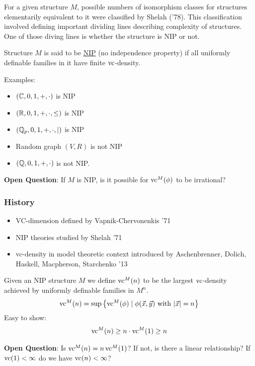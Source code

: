 \documentclass{beamer}
\newcommand{\curly}[1]{\left\{ #1 \right\}}
\newcommand{\defn}{\underline}
\begin{document}
\begin{frame}
  For a given structure $M$, possible numbers of isomorphism classes for structures elementarily equivalent to it were classified by Shelah ('78).
  This classification involved defining important dividing lines describing complexity of structures.
  One of those diving lines is whether the structure is NIP or not.
  \begin{Definition}
    Structure $M$ is said to be \defn{NIP} (no independence property) if all uniformly definable families in it have finite $\operatorname{vc}$-density.
  \end{Definition}
  Examples:
  \begin{itemize}
  \item $(\mathbb{C}, 0, 1, +, \cdot)$ is NIP
  \item $(\mathbb{R}, 0, 1, +, \cdot, \leq)$ is NIP
  \item $(\mathbb{Q}_p, 0, 1, +, \cdot, \mid)$ is NIP
  \item Random graph $(V, R)$ is not NIP
  \item $(\mathbb{Q}, 0, 1, +, \cdot)$ is not NIP.
  \end{itemize}

  \textbf{Open Question}: If $M$ is NIP, is it possible for $\operatorname{vc}^M(\phi)$ to be irrational? \\
\end{frame}

\begin{frame}
  \frametitle{History}
  \begin{itemize}
  \item VC-dimension defined by Vapnik-Chervonenkis '71
  \item NIP theories studied by Shelah '71
  \item vc-density in model theoretic context introduced by Aschenbrenner, Dolich, Haskell, Macpherson, Starchenko '13
  \end{itemize}
\end{frame}

\begin{frame}
  Given an NIP structure $M$ we define $\operatorname{vc}^M(n)$ to be the largest $\operatorname{vc}$-density achieved by uniformly definable families in $M^n$.
  \begin{align*}
    \vc^M(n) = \sup \curly{ \vc^M(\phi) \mid \phi(\vec x, \vec y) \text{ with } |\vec x| = n}
  \end{align*}
  Easy to show:
  \begin{align*}
    \operatorname{vc}^M(n) \geq n \cdot \operatorname{vc}^M(1) \geq n
  \end{align*}

  \textbf{Open Question}: Is $\operatorname{vc}^M(n) = n \operatorname{vc}^M(1)$? If not, is there a linear relationship? If $\operatorname{vc}(1) < \infty$ do we have $\operatorname{vc}(n) < \infty$?
\end{frame}
\end{document}
